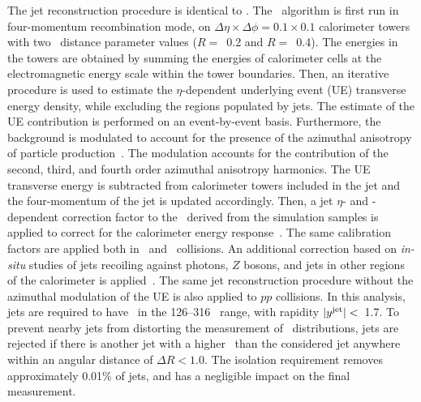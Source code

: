 
The jet reconstruction procedure is identical to \cite{2019108}. 
The \antikt\ algorithm is first run in four-momentum recombination mode, on
$\Delta \eta \times \Delta \phi = 0.1\times 0.1$  calorimeter towers with two \antikt\ distance parameter values ($R=$~0.2 and $R=$~0.4). The energies in the towers are obtained by summing the
	energies of calorimeter cells at the electromagnetic energy scale within the tower boundaries. Then,
	  an iterative procedure is used to estimate the $\eta$-dependent underlying event (UE)  transverse energy density, while excluding the regions populated by jets. The estimate of the UE contribution is performed on an event-by-event basis.
	Furthermore, the background is modulated to account for the presence of the azimuthal anisotropy of particle production~\cite{ATLAS:2012at}. The modulation accounts for the contribution of the second, third, and fourth order azimuthal anisotropy harmonics.
	The UE transverse energy is subtracted from calorimeter towers included in the jet and the four-momentum of the jet is updated accordingly.
	  Then, a jet $\eta$- and \pT-dependent  correction factor to the \ptjet\ 
	  derived from the simulation samples is applied to correct for the calorimeter energy
	  response~\cite{Aaboud:2017jcu}. The same calibration factors are applied both 
in \pp\ and \pbpb\ collisions.
An additional correction based on \textit{in-situ} studies of jets recoiling against photons, $Z$ bosons, and jets in other regions of the calorimeter is
	  applied~\cite{ATL-PHYS-PUB-2015-036,2019167}. The same jet reconstruction procedure without the
	  azimuthal modulation of the UE is also applied to $pp$ collisions.
	  In this analysis, jets are required to have \ptjet\ in the 126--316 \GeV\ range, with rapidity  $|\mbox{$y^{\mathrm{jet}}$}|<$~1.7. 
 To prevent nearby jets from distorting the measurement of \Dptr\ distributions, 
jets are rejected if there is another jet with a higher \ptjet\ than the considered jet anywhere
within an angular distance of $\Delta R < 1.0$. The isolation requirement removes approximately 0.01\% of jets, and has a negligible impact on the final measurement.

